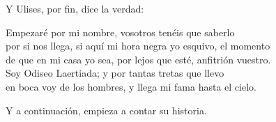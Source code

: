 Y Ulises, por fin, dice la verdad:

\begin{versocita}
Empezaré por mi nombre, vosotros tenéis que saberlo\\
por si nos llega, si aquí mi hora negra yo esquivo, el momento\\
de que en mi casa yo sea, por lejos que esté, anfitrión vuestro.\\
Soy Odiseo Laertiada; y por tantas tretas que llevo\\
en boca voy de los hombres, y llega mi fama hasta el cielo.
\end{versocita}

Y a continuación, empieza a contar su historia.

%
%
%
%
